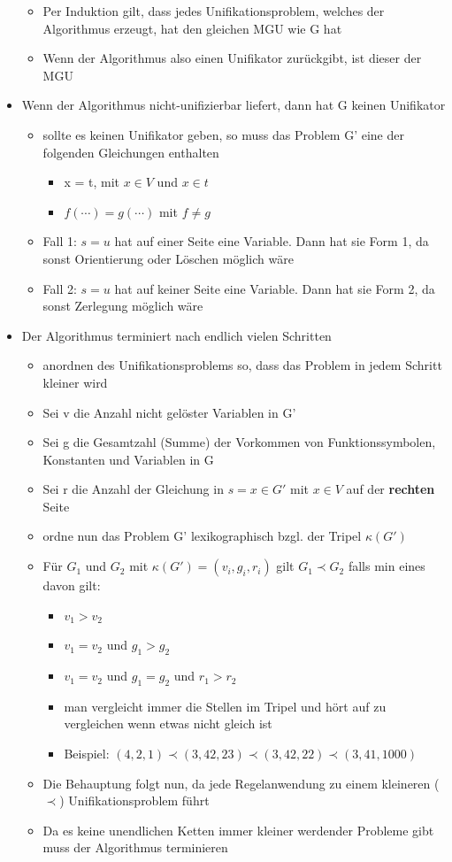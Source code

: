 \documentclass[12pt,a4paper]{article}
\begin{document}
\begin{itemize}
\begin{itemize}
\item Per Induktion gilt, dass jedes Unifikationsproblem, welches der Algorithmus erzeugt, hat den gleichen MGU wie G hat
\item Wenn der Algorithmus also einen Unifikator zurückgibt, ist dieser der MGU
\end{itemize}
\item Wenn der Algorithmus nicht-unifizierbar liefert, dann hat G keinen Unifikator
\begin{itemize}
\item sollte es keinen Unifikator geben, so muss das Problem G' eine der folgenden Gleichungen enthalten
\begin{itemize}
\item x = t, mit $x\in V$ und $x\in t$
\item $f(\cdots) = g(\cdots)$ mit $f\neq g$
\end{itemize}
\item Fall 1: $s=u$ hat auf einer Seite eine Variable. Dann hat sie Form 1, da sonst Orientierung oder Löschen möglich wäre
\item Fall 2: $s=u$ hat auf keiner Seite eine Variable. Dann hat sie Form 2, da sonst Zerlegung möglich wäre
\end{itemize}
\item Der Algorithmus terminiert nach endlich vielen Schritten
\begin{itemize}
\item anordnen des Unifikationsproblems so, dass das Problem in jedem Schritt kleiner wird
\item Sei v die Anzahl nicht gelöster Variablen in G'
\item Sei g die Gesamtzahl (Summe) der Vorkommen von Funktionssymbolen, Konstanten und Variablen in G
\item Sei r die Anzahl der Gleichung in $s=x \in G'$ mit $x\in V$ auf der \textbf{rechten} Seite
\item ordne nun das Problem G' lexikographisch bzgl. der Tripel $\kappa(G')$
\item Für $G_1$ und $G_2$ mit $\kappa(G') = (v_i, g_i, r_i)$ gilt $G_1 \prec G_2$ falls min eines davon gilt:
\begin{itemize}
\item $v_1 > v_2$
\item $v_1 = v_2$ und $g_1 > g_2$
\item $v_1 = v_2$ und $g_1 = g_2$ und $r_1 > r_2$ 
\item man vergleicht immer die Stellen im Tripel und hört auf zu vergleichen wenn etwas nicht gleich ist
\item Beispiel: $(4, 2, 1) \prec (3, 42, 23) \prec (3, 42, 22) \prec (3, 41, 1000)$
\end{itemize}
\item Die Behauptung folgt nun, da jede Regelanwendung zu einem kleineren ($\prec$) Unifikationsproblem führt
\item Da es keine unendlichen Ketten immer kleiner werdender Probleme gibt muss der Algorithmus terminieren
\end{itemize}
\end{itemize}
\end{document}
